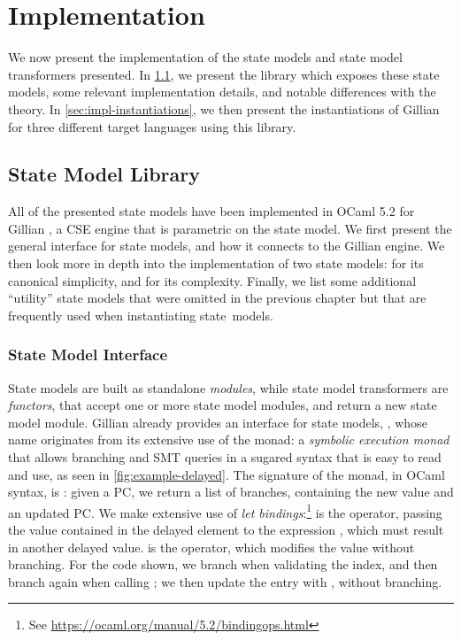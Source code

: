 \chapter{Implementation} \label{chap:implementation}

We now present the implementation of the state models and state model transformers presented. In \cref{sec:state-model-lib}, we present the library which exposes these state models, some relevant implementation details, and notable differences with the theory. In \cref{sec:impl-instantiations}, we then present the instantiations of Gillian for three different target languages using this library.

\section{State Model Library} \label{sec:state-model-lib}

All of the presented state models have been implemented in OCaml 5.2 \cite{ocaml} for Gillian \cite{gillian0,gillian1,gillian2}, a CSE engine that is parametric on the state model. We first present the general interface for state models, and how it connects to the Gillian engine. We then look more in depth into the implementation of two state models: \Ex{} for its canonical simplicity, and \PMap{} for its complexity. Finally, we list some additional ``utility'' state models that were omitted in the previous chapter but that are frequently used when instantiating state~models.

\subsection{State Model Interface}

State models are built as standalone \emph{modules}, while state model transformers are \emph{functors}, that accept one or more state model modules, and return a new state model module. Gillian already provides an interface for state models, , whose name originates from its extensive use of the  monad: a \emph{symbolic execution monad} that allows branching and SMT queries in a sugared syntax that is easy to read and use, as seen in \autoref{fig:example-delayed}. The signature of the monad, in OCaml syntax, is : given a PC, we return a list of branches, containing the new value and an updated PC. We make extensive use of \emph{let bindings}:\footnote{See \url{https://ocaml.org/manual/5.2/bindingops.html}}  is the  operator, passing the value  contained in the delayed element  to the expression , which must result in another delayed value.  is the  operator, which modifies the value without branching. For the code shown, we branch when validating the index, and then branch again when calling ; we then update the entry with , without branching.

